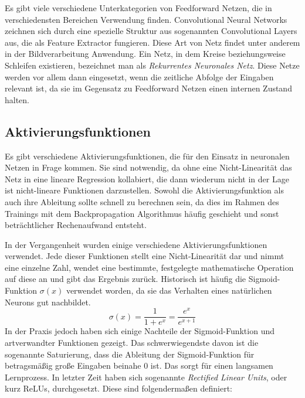 Es gibt viele verschiedene Unterkategorien von Feedforward Netzen, die in verschiedensten Bereichen Verwendung finden.
Convolutional Neural Networks zeichnen sich durch eine spezielle Struktur aus sogenannten Convolutional Layers aus, die als Feature Extractor fungieren.
Diese Art von Netz findet unter anderem in der Bildverarbeitung Anwendung.
Ein Netz, in dem Kreise beziehungsweise Schleifen existieren, bezeichnet man als \textit{Rekurrentes Neuronales Netz}.
Diese Netze werden vor allem dann eingesetzt, wenn die zeitliche Abfolge der Eingaben relevant ist, 
da sie im Gegensatz zu Feedforward Netzen einen internen Zustand halten.

\subsection{Aktivierungsfunktionen}
\label{sec:activationfuncs}
Es gibt verschiedene Aktivierungsfunktionen, die für den Einsatz in neuronalen Netzen in Frage kommen.
Sie sind notwendig, da ohne eine Nicht-Linearität das Netz in eine lineare Regression kollabiert, 
die dann wiederum nicht in der Lage ist nicht-lineare Funktionen darzustellen.
Sowohl die Aktivierungsfunktion als auch ihre Ableitung sollte schnell zu berechnen sein, 
da dies im Rahmen des Trainings mit dem Backpropagation Algorithmus häufig geschieht 
und sonst beträchtlicher Rechenaufwand entsteht.

In der Vergangenheit wurden einige verschiedene Aktivierungsfunktionen verwendet.
Jede dieser Funktionen stellt eine Nicht-Linearität dar und nimmt eine einzelne Zahl, wendet eine bestimmte, festgelegte mathematische 
Operation auf diese an und gibt das Ergebnis zurück.
Historisch ist häufig die Sigmoid-Funktion \(\sigma(x)\) verwendet worden, da sie das Verhalten eines natürlichen Neurons gut nachbildet.
\begin{equation}
	\sigma(x) = \frac{1}{1 + e^x} = \frac{e^x}{e^{x + 1}}
	\label{func:Sigmoid}
\end{equation}
In der Praxis jedoch haben sich einige Nachteile der Sigmoid-Funktion und artverwandter Funktionen  gezeigt.
Das schwerwiegendste davon ist die sogenannte Saturierung,
dass die Ableitung der Sigmoid-Funktion für betragsmäßig große Eingaben beinahe \(0\) ist.
Das sorgt für einen langsamen Lernprozess.
In letzter Zeit haben sich sogenannte \textit{Rectified Linear Units}, oder kurz ReLUs, durchgesetzt.
Diese sind folgendermaßen definiert:
% 
	
